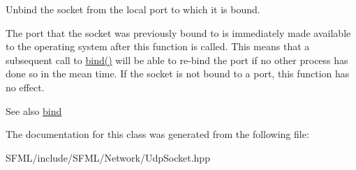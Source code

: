 Unbind the socket from the local port to which it is bound. 

The port that the socket was previously bound to is immediately made available to the operating system after this function is called. This means that a subsequent call to \mbox{\hyperlink{classsf_1_1_udp_socket_ad764c3d06d90b4714dcc97a0d1647bcc}{bind()}} will be able to re-\/bind the port if no other process has done so in the mean time. If the socket is not bound to a port, this function has no effect.

\begin{DoxySeeAlso}{See also}
\mbox{\hyperlink{classsf_1_1_udp_socket_ad764c3d06d90b4714dcc97a0d1647bcc}{bind}} \begin{DoxyVerb}\end{DoxyVerb}
 
\end{DoxySeeAlso}


The documentation for this class was generated from the following file\+:\begin{DoxyCompactItemize}
\item 
S\+F\+M\+L/include/\+S\+F\+M\+L/\+Network/Udp\+Socket.\+hpp\end{DoxyCompactItemize}
